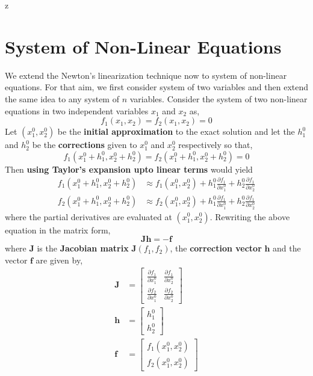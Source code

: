 z\documentclass[a4paper,12pt,twoside]{book}
\newcommand{\nll}[0]{\newline\newline}
\begin{document}
\chapter{System of Non-Linear Equations}
We extend the Newton's linearization technique now to system of non-linear equations. For that aim, we first consider system of two variables and then extend the same idea to any system of $n$ variables.
\nll
Consider the system of two non-linear equations in two independent variables $x_1$ and $x_2$ as,
\[f_1(x_1,x_2) = f_2(x_1,x_2) = 0\]
Let $(x_1^0, x_2^0)$ be the \textbf{initial approximation} to the exact solution and let the $h_1^0$ and $h_2^0$ be the \textbf{corrections} given to $x_1^0$ and $x_2^0$ respectively so that,
\[ f_1(x_1^0 + h_1^0, x_2^0 + h_2^0) = f_2(x_1^0 + h_1^0, x_2^0 + h_2^0) = 0\]
Then \textbf{using Taylor's expansion upto linear terms} would yield
\begin{equation*}
    \begin{split}
        f_1(x_1^0 + h_1^0, x_2^0 + h_2^0) &\approx f_1(x_1^0, x_2^0) + h_1^0 \frac{\partial f_1}{\partial x_1^0} + h_2^0 \frac{\partial f_1 }{\partial x_2^0}\\
        f_2(x_1^0 + h_1^0, x_2^0 + h_2^0) &\approx f_2(x_1^0, x_2^0) + h_1^0 \frac{\partial f_1}{\partial x_1^0} + h_2^0 \frac{\partial f_1 }{\partial x_2^0}
    \end{split}
\end{equation*}
where the partial derivatives are evaluated at $(x_1^0, x_2^0)$.
\nll
Rewriting the above equation in the matrix form,
\begin{equation*}
\mathbf{J}\mathbf{h} = -\mathbf{f}
\end{equation*}
where $\mathbf{J}$ is the  \textbf{Jacobian matrix} $\mathbf{J}(f_1, f_2)$, the \textbf{correction vector} $\mathbf{h}$ and the vector $\mathbf{f}$ are given by,
\begin{equation*}
    \begin{split}
        \mathbf{J} &= \begin{bmatrix} \frac{\partial f_1}{\partial x_1^0} & \frac{\partial f_1}{\partial x_2^0} \\
        \frac{\partial f_2}{\partial x_1^0}&
        \frac{\partial f_2}{\partial x_2^0}\end{bmatrix}\\
        \mathbf{h} &= \begin{bmatrix} h_1^0 \\ h_2^0 \end{bmatrix}\\
        \mathbf{f} &= \begin{bmatrix} f_1(x_1^0, x_2^0)\\f_2(x_1^0, x_2^0)
        \end{bmatrix}
    \end{split}
\end{equation*}
\end{document}
